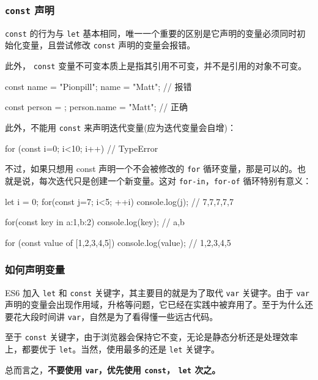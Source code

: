 \subsubsection{\texttt{const} 声明}

\texttt{const} 的行为与 \texttt{let} 基本相同，唯一一个重要的区别是它声明的变量必须同时初始化变量，且尝试修改 \texttt{const} 声明的变量会报错。

此外， \texttt{const} 变量不可变本质上是指其引用不可变，并不是引用的对象不可变。

\begin{JavaScript}
const name = "Pionpill";
name = "Matt";      // 报错

const person = {};
person.name = "Matt";   // 正确
\end{JavaScript}

此外，不能用 \texttt{const} 来声明迭代变量(应为迭代变量会自增)：
\begin{JavaScript}
for (const i=0; i<10; i++) {}   // TypeError
\end{JavaScript}

不过，如果只想用 const 声明一个不会被修改的 \texttt{for} 循环变量，那是可以的。也就是说，每次迭代只是创建一个新变量。这对 \texttt{for-in}，\texttt{for-of} 循环特别有意义：

\begin{JavaScript}
let i = 0;
for(const j=7; i<5; ++i) {
    console.log(j);
}
// 7,7,7,7,7

for(const key in {a:1,b:2}) {
    console.log(key);
}
// a,b

for (const value of [1,2,3,4,5]) {
    console.log(value);
}
// 1,2,3,4,5
\end{JavaScript}

\subsubsection*{如何声明变量}

ES6 加入 \texttt{let} 和 \texttt{const} 关键字，其主要目的就是为了取代 \texttt{var} 关键字。由于 \texttt{var} 声明的变量会出现作用域，升格等问题，它已经在实践中被弃用了。至于为什么还要花大段时间讲 \texttt{var}，自然是为了看得懂一些远古代码。

至于 \texttt{const} 关键字，由于浏览器会保持它不变，无论是静态分析还是处理效率上，都要优于 \texttt{let}。当然，使用最多的还是 \texttt{let} 关键字。

总而言之，\textbf{不要使用 \texttt{var}，优先使用 \texttt{const}， \texttt{let} 次之。}

